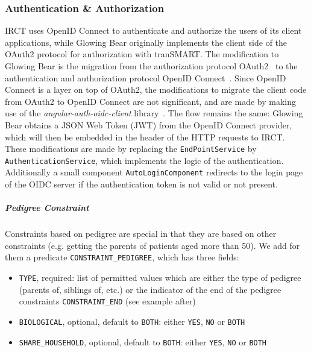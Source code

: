 


\subsubsection{Authentication \& Authorization}

IRCT uses OpenID Connect to authenticate and authorize the users of its client applications, while Glowing Bear originally implements the client side of the OAuth2 protocol for authorization with tranSMART. 
The modification to Glowing Bear is the migration from the authorization protocol OAuth2~\cite{oauth2} to the authentication and authorization protocol OpenID Connect~\cite{openidconnect}.
Since OpenID Connect is a layer on top of OAuth2, the modifications to migrate the client code from OAuth2 to OpenID Connect are not significant, and are made by making use of the \emph{angular-auth-oidc-client} library~\cite{angular-auth-oidc-client}.
The flow remains the same: Glowing Bear obtains a JSON Web Token (JWT) from the OpenID Connect provider, which will then be embedded in the header of the HTTP requests to IRCT.
These modifications are made by replacing the \verb|EndPointService| by \verb|AuthenticationService|, which implements the logic of the authentication.
Additionally a small component \verb|AutoLoginComponent| redirects to the login page of the OIDC server if the authentication token is not valid or not present.

\subparagraph{Pedigree Constraint}
Constraints based on pedigree are special in that they are based on other constraints (e.g. getting the parents of patients aged more than 50).
We add for them a predicate \verb|CONSTRAINT_PEDIGREE|, which has three fields:
\begin{itemize}
    \item \verb|TYPE|, required: list of permitted values which are either the type of pedigree (parents of, siblings of, etc.) or the indicator of the end of the pedigree constraints \verb|CONSTRAINT_END| (see example after)
    \item \verb|BIOLOGICAL|, optional, default to \verb|BOTH|: either \verb|YES|, \verb|NO| or \verb|BOTH|
    \item \verb|SHARE_HOUSEHOLD|, optional, default to \verb|BOTH|: either \verb|YES|, \verb|NO| or \verb|BOTH|
\end{itemize}


